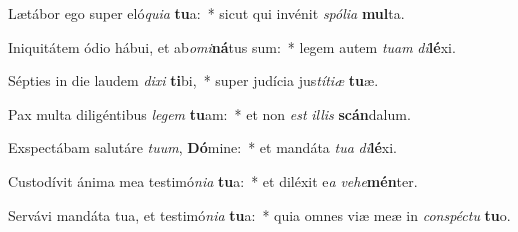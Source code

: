 \item Lætábor ego super eló\textit{qui}\textit{a} \textbf{tu}a:~* sicut qui invénit \textit{spó}\textit{li}\textit{a} \textbf{mul}ta.
\item Iniquitátem ódio hábui, et ab\textit{o}\textit{mi}\textbf{ná}tus sum:~* legem autem \textit{tu}\textit{am} \textit{di}\textbf{lé}xi.
\item Sépties in die laudem \textit{di}\textit{xi} \textbf{ti}bi,~* super judícia jus\textit{tí}\textit{ti}\textit{æ} \textbf{tu}æ.
\item Pax multa diligéntibus \textit{le}\textit{gem} \textbf{tu}am:~* et non \textit{est} \textit{il}\textit{lis} \textbf{scán}dalum.
\item Exspectábam salutáre \textit{tu}\textit{um}, \textbf{Dó}mine:~* et mandáta \textit{tu}\textit{a} \textit{di}\textbf{lé}xi.
\item Custodívit ánima mea testimó\textit{ni}\textit{a} \textbf{tu}a:~* et diléxit e\textit{a} \textit{ve}\textit{he}\textbf{mén}ter.
\item Servávi mandáta tua, et testimó\textit{ni}\textit{a} \textbf{tu}a:~* quia omnes viæ meæ in \textit{con}\textit{spéc}\textit{tu} \textbf{tu}o.
